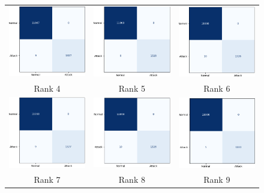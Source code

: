 \documentclass[preprint,12pt,authoryear]{elsarticle}
\begin{document}
\begin{figure}[H]
    \centering
    \begin{tabular}{ccc}
        \includegraphics[width=0.3\linewidth]{rank_4.png} &
        \includegraphics[width=0.3\linewidth]{rank_5.png} &
        \includegraphics[width=0.3\linewidth]{rank_6.png} \\
        \small Rank 4 & \small Rank 5 & \small Rank 6 \\[3pt]

        \includegraphics[width=0.3\linewidth]{rank_7.png} &
        \includegraphics[width=0.3\linewidth]{rank_8.png} &
        \includegraphics[width=0.3\linewidth]{rank_9.png} \\
        \small Rank 7 & \small Rank 8 & \small Rank 9 \\[3pt]


\end{tabular}
\end{figure}
\end{document}
